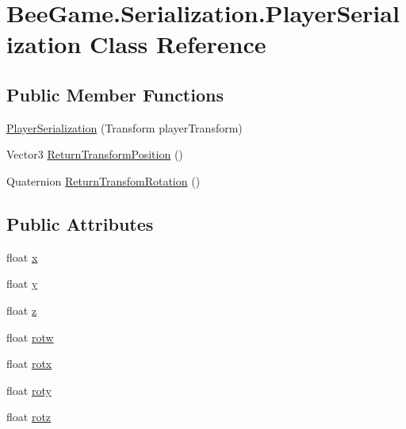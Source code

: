 \hypertarget{class_bee_game_1_1_serialization_1_1_player_serialization}{}\section{Bee\+Game.\+Serialization.\+Player\+Serialization Class Reference}
\label{class_bee_game_1_1_serialization_1_1_player_serialization}
\subsection*{Public Member Functions}
\begin{DoxyCompactItemize}
\item 
\hyperlink{class_bee_game_1_1_serialization_1_1_player_serialization_a9be0b00db5f4f0395b8408587f219123}{Player\+Serialization} (Transform player\+Transform)
\item 
Vector3 \hyperlink{class_bee_game_1_1_serialization_1_1_player_serialization_a0dc185edb71e6952aeb2382ee0e51931}{Return\+Transform\+Position} ()
\item 
Quaternion \hyperlink{class_bee_game_1_1_serialization_1_1_player_serialization_a0c8bfc459f24a64f9e6d39305dba1fb2}{Return\+Transfom\+Rotation} ()
\end{DoxyCompactItemize}
\subsection*{Public Attributes}
\begin{DoxyCompactItemize}
\item 
float \hyperlink{class_bee_game_1_1_serialization_1_1_player_serialization_a36758d72f4f33b21f296f5e648b772a5}{x}
\item 
float \hyperlink{class_bee_game_1_1_serialization_1_1_player_serialization_ada22143d639a1fbd59b52943362202ae}{y}
\item 
float \hyperlink{class_bee_game_1_1_serialization_1_1_player_serialization_a9836712a8e5f645bea8304e50fb84e51}{z}
\item 
float \hyperlink{class_bee_game_1_1_serialization_1_1_player_serialization_af292d134d5b6171724f6797e390bde77}{rotw}
\item 
float \hyperlink{class_bee_game_1_1_serialization_1_1_player_serialization_a5c7c1d06654a4aad49a3fb3b9cd11835}{rotx}
\item 
float \hyperlink{class_bee_game_1_1_serialization_1_1_player_serialization_a5411f99b7942e8d4f848b001fc49c39f}{roty}
\item 
float \hyperlink{class_bee_game_1_1_serialization_1_1_player_serialization_adfa5b8ed3fa3ef68460302186054dae5}{rotz}
\end{DoxyCompactItemize}
